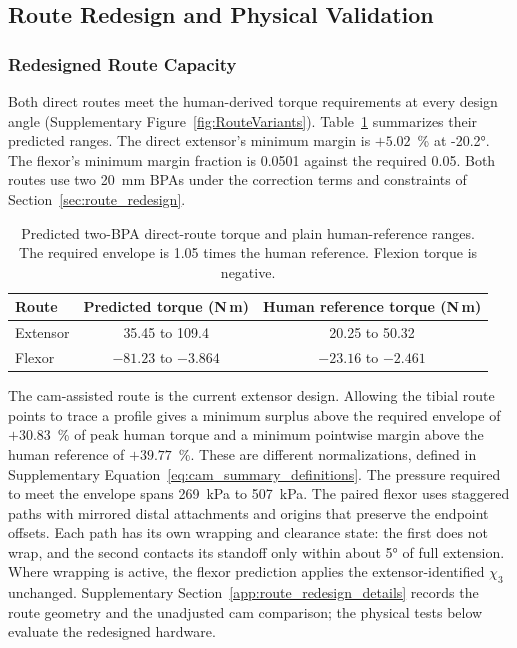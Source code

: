 \documentclass[utf8]{FrontiersinHarvard} %
\begin{document}
\subsection{Route Redesign and Physical Validation}\label{sec:route_redesign_results}

\subsubsection{Redesigned Route Capacity}

Both direct routes meet the human-derived torque requirements at every design angle (Supplementary Figure~\ref{fig:RouteVariants}). Table~\ref{tab:direct_route_capacity} summarizes their predicted ranges. The direct extensor's minimum margin is $+5.02$~\% at \ang{-20.2}. The flexor's minimum margin fraction is 0.0501 against the required 0.05. Both routes use two \qty{20}{\mm} BPAs under the correction terms and constraints of Section~\ref{sec:route_redesign}.

\begin{table}[htbp]
\centering
\begingroup\fontsize{10pt}{12pt}\selectfont
\caption{Predicted two-BPA direct-route torque and plain human-reference ranges. The required envelope is 1.05 times the human reference. Flexion torque is negative.}
\label{tab:direct_route_capacity}
\begin{tabular}{@{}lcc@{}}
\toprule
\textbf{Route} & \textbf{Predicted torque (N\,m)} & \textbf{Human reference torque (N\,m)} \\
\midrule
Extensor & 35.45 to 109.4 & 20.25 to 50.32 \\
Flexor & $-81.23$ to $-3.864$ & $-23.16$ to $-2.461$ \\
\bottomrule
\end{tabular}
\endgroup
\end{table}

The cam-assisted route is the current extensor design. Allowing the tibial route points to trace a profile gives a minimum surplus above the required envelope of $+30.83$~\% of peak human torque and a minimum pointwise margin above the human reference of $+39.77$~\%. These are different normalizations, defined in Supplementary Equation~\eqref{eq:cam_summary_definitions}. The pressure required to meet the envelope spans \qty{269}{\kPa} to \qty{507}{\kPa}. The paired flexor uses staggered paths with mirrored distal attachments and origins that preserve the endpoint offsets. Each path has its own wrapping and clearance state: the first does not wrap, and the second contacts its standoff only within about \ang{5} of full extension. Where wrapping is active, the flexor prediction applies the extensor-identified $\chi_3$ unchanged. Supplementary Section~\ref{app:route_redesign_details} records the route geometry and the unadjusted cam comparison; the physical tests below evaluate the redesigned hardware.
\end{document}
